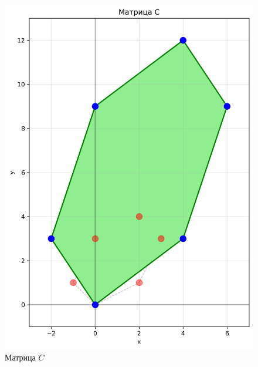 \begin{figure}[h]
\centering
\begin{minipage}{0.23\textwidth}
\centering
\includegraphics[width=\textwidth]{images/task1/matrix_C.png}
\caption{Матрица $C$}
\label{fig:matrix_C}
\end{minipage}
\hfill
\begin{minipage}{0.23\textwidth}
\centering

\end{minipage}
\end{figure}
